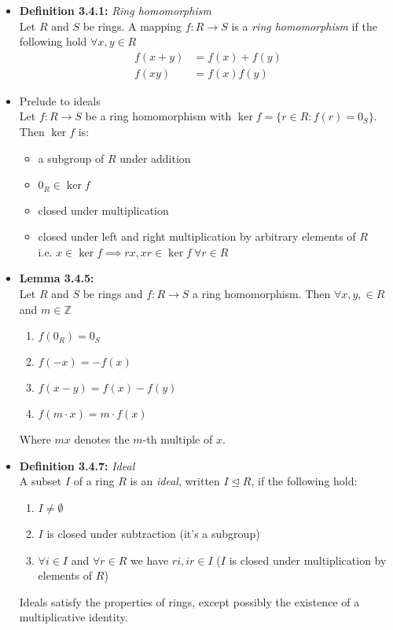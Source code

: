 \documentclass[11pt,a4paper]{article}
\begin{document}
\begin{itemize}

    \item \textbf{Definition 3.4.1:} \emph{Ring homomorphism} \\
        Let $R$ and $S$ be rings.
        A mapping $f : R \to S$ is a \emph{ring homomorphism} if the following hold
        $\forall x,y\in R$
        \begin{align*}{}
            f(x+y) & = f(x) + f(y) \\
            f(xy)  & = f(x)f(y)
        \end{align*}

    \item Prelude to ideals \\
        Let $f : R \to S$ be a ring homomorphism with $\ker f = \{ r \in R : f(r) = 0_S \}$.
        Then $\ker f$ is:
        \begin{itemize}
            \item a subgroup of $R$ under addition
            \item $0_R \in \ker f$
            \item closed under multiplication
            \item closed under left and right multiplication by arbitrary elements of $R$ \\
                i.e. $x \in \ker f \implies rx, xr \in \ker f \ \forall r \in R$
        \end{itemize}

    \item \textbf{Lemma 3.4.5:} \\
        Let $R$ and $S$ be rings and $f : R \to S$ a ring homomorphism.
        Then $\forall x,y, \in R$ and $m \in \mathbb{Z}$
        \begin{enumerate}
            \item $f(0_R) = 0_S$
            \item $f(-x) = -f(x)$
            \item $f(x-y) = f(x) - f(y)$
            \item $f(m \cdot x) = m\cdot f(x)$
        \end{enumerate}
        Where $mx$ denotes the $m$-th multiple of $x$.

    \item \textbf{Definition 3.4.7:} \emph{Ideal} \\
        A subset $I$ of a ring $R$ is an \emph{ideal}, written $I \trianglelefteq R$,
        if the following hold:
        \begin{enumerate}
            \item $I \neq \emptyset$
            \item $I$ is closed under subtraction (it's a subgroup)
            \item $\forall i \in I$ and $\forall r \in R$ we have $ri, ir \in I$
                ($I$ is closed under multiplication by elements of $R$)
        \end{enumerate}
        Ideals satisfy the properties of rings, except possibly the existence of a multiplicative
        identity.


\end{itemize}
\end{document}
